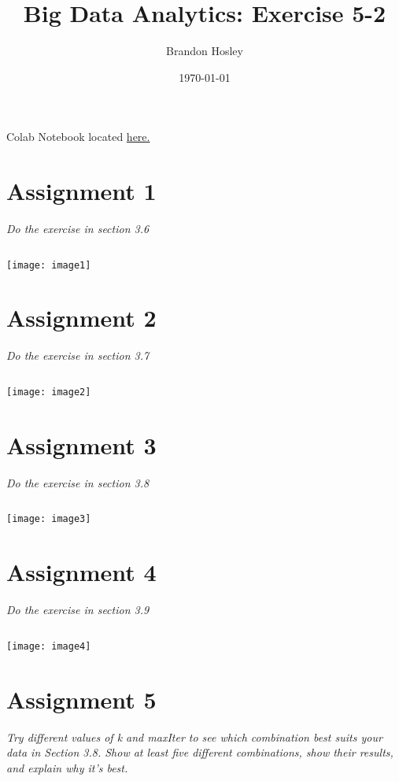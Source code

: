 \documentclass[]{article}
\title{Big Data Analytics: Exercise 5-2}
\author{Brandon Hosley}
\date{\today}
\begin{document}
\maketitle

Colab Notebook located
\href{}{here.}

\section*{Assignment 1}
\emph{ Do the exercise in section 3.6 }

\begin{verbatim}

\end{verbatim}
\texttt{[image: image1]}


\section*{Assignment 2}
\emph{ Do the exercise in section 3.7 }

\begin{verbatim}

\end{verbatim}
\texttt{[image: image2]} 


\section*{Assignment 3}
\emph{ Do the exercise in section 3.8 }

\begin{verbatim}

\end{verbatim}
\texttt{[image: image3]} 


\section*{Assignment 4}
\emph{ Do the exercise in section 3.9 }

\begin{verbatim}

\end{verbatim}
\texttt{[image: image4]} %


\section*{Assignment 5}
\emph{ Try different values of k and maxIter to see which combination best suits your data in Section 3.8. Show at least five different combinations, show their results, and explain why it’s best.
}
\end{document}
